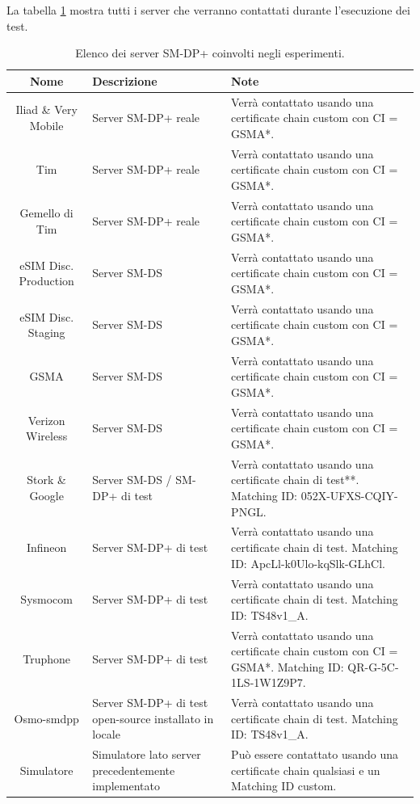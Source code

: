 \documentclass[10pt, oneside]{book}
\begin{document}
La tabella \ref{tab:all-servers} mostra tutti i server che verranno contattati durante l'esecuzione dei test.\\

\begin{table}[h!]
\begin{center}
\captionsetup{skip=4pt}
\caption{Elenco dei server SM-DP+ coinvolti negli esperimenti.}
\label{tab:all-servers}
\begin{tabularx}{\textwidth}{|c|X|X|} %
\hline
\textbf{Nome} & \textbf{Descrizione} & \textbf{Note}\\
\hline
Iliad \& Very Mobile & Server SM-DP+ reale & Verrà contattato usando una certificate chain custom con CI = GSMA*.\\
\hline
Tim & Server SM-DP+ reale & Verrà contattato usando una certificate chain custom con CI = GSMA*.\\
\hline
Gemello di Tim & Server SM-DP+ reale & Verrà contattato usando una certificate chain custom con CI = GSMA*.\\
\hline
eSIM Disc. Production & Server SM-DS & Verrà contattato usando una certificate chain custom con CI = GSMA*.\\
\hline
eSIM Disc. Staging & Server SM-DS & Verrà contattato usando una certificate chain custom con CI = GSMA*.\\
\hline
GSMA & Server SM-DS & Verrà contattato usando una certificate chain custom con CI = GSMA*.\\
\hline
Verizon Wireless & Server SM-DS & Verrà contattato usando una certificate chain custom con CI = GSMA*.\\
\hline
Stork \& Google & Server SM-DS / SM-DP+ di test & Verrà contattato usando una certificate chain di test**. Matching ID: 052X-UFXS-CQIY-PNGL.\\
\hline
Infineon & Server SM-DP+ di test & Verrà contattato usando una certificate chain di test. Matching ID: ApcLl-k0Ulo-kqSlk-GLhCl.\\
\hline
Sysmocom & Server SM-DP+ di test & Verrà contattato usando una certificate chain di test. Matching ID: TS48v1\_A.\\
\hline
Truphone & Server SM-DP+ di test & Verrà contattato usando una certificate chain custom con CI = GSMA*. Matching ID: QR-G-5C-1LS-1W1Z9P7.\\
\hline
Osmo-smdpp & Server SM-DP+ di test open-source installato in locale & Verrà contattato usando una certificate chain di test. Matching ID: TS48v1\_A.\\
\hline
Simulatore & Simulatore lato server precedentemente implementato & Può essere contattato usando una certificate chain qualsiasi e un Matching ID custom.\\
\hline
\end{tabularx}
\end{center}
\end{table}
\end{document}
